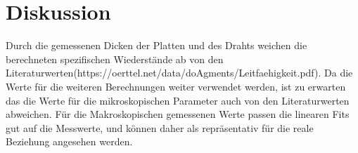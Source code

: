 \section{Diskussion}
Durch die gemessenen Dicken der Platten und des Drahts weichen die berechneten spezifischen Wiederstände ab von den Literaturwerten(https://oerttel.net/data/doAgments/Leitfaehigkeit.pdf).
Da die Werte für die weiteren Berechnungen weiter verwendet werden, ist zu erwarten das die Werte für die mikroskopischen Parameter auch von den Literaturwerten abweichen.
Für die Makroskopischen gemessenen Werte passen die linearen Fits gut auf die Messwerte, und können daher als repräsentativ für die reale Beziehung angesehen werden. 
\label{sec:Diskussion}
